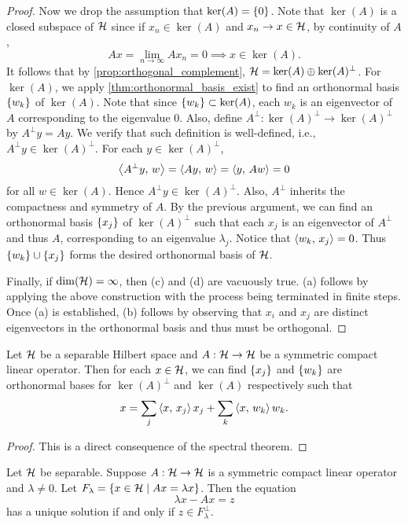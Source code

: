 \begin{proof}
    Now we drop the assumption that $\ker(A) = \left\{ {0} \right\}$. Note that $\ker(A)$ is a 
    closed subspace of $\mathcal{H}$ since if $x_n\in\ker(A)$ and $x_n\to x\in\mathcal{H}$, by continuity 
    of $A$, 
    \begin{equation*}
        Ax = \lim_{n\to\infty} Ax_n = 0
        \implies x\in\ker(A).
    \end{equation*} 
    It follows that by \cref{prop:orthogonal_complement}, $\mathcal{H} = \ker(A)\oplus\ker(A)^\perp$. 
    For $\ker(A)$, we apply \cref{thm:orthonormal_basis_exist} to find an orthonormal 
    basis $\left\{ {w_k} \right\}$ of $\ker(A)$. Note that since $\left\{ {w_k} \right\}\subset \ker(A)$, each 
    $w_k$ is an eigenvector of $A$ corresponding to the eigenvalue $0$. Also, 
    define $A^\perp:\ker(A)^\perp\to\ker(A)^\perp$ by $A^\perp y = Ay$. We verify 
    that such definition is well-defined, i.e., $A^\perp y\in\ker(A)^\perp$. For 
    each $y\in\ker(A)^\perp$,
    \begin{equation*}
        \left\langle {A^\perp y},\, {w} \right\rangle = \left\langle {Ay},\, {w} \right\rangle = \left\langle {y},\, {Aw} \right\rangle = 0
    \end{equation*}
    for all $w\in\ker(A)$. Hence $A^\perp y\in\ker(A)^\perp$. Also, $A^\perp$ inherits 
    the compactness and symmetry of $A$. By the previous argument, we can find an 
    orthonormal basis $\left\{ {x_j} \right\}$ of $\ker(A)^\perp$ such that each $x_j$ is an 
    eigenvector of $A^\perp$ and thus $A$, corresponding to an eigenvalue $\lambda_j$. 
    Notice that $\left\langle {w_k},\, {x_j} \right\rangle = 0$. Thus $\left\{ {w_k} \right\}\cup\left\{ {x_j} \right\}$ forms the desired 
    orthonormal basis of $\mathcal{H}$. 

    Finally, if $\dim(\mathcal{H}) = \infty$, then (c) and (d) are vacuously true. 
    (a) follows by applying the above construction with the process 
    being terminated in finite steps. Once (a) is established, (b) follows 
    by observing that $x_i$ and $x_j$ are distinct eigenvectors in the orthonormal 
    basis and thus must be orthogonal.
\end{proof}

\begin{corollary}
    Let $\mathcal{H}$ be a separable Hilbert space and $A:\mathcal{H}\to\mathcal{H}$ be a symmetric compact 
    linear operator. Then for each $x\in\mathcal{H}$, we can find $\left\{ {x_j} \right\}$ and $\left\{ {w_k} \right\}$ 
    are orthonormal bases for $\ker(A)^\perp$ and $\ker(A)$ respectively such that 
    \begin{equation*}
        x = \sum_j\left\langle {x},\, {x_j} \right\rangle x_j + \sum_k\left\langle {x},\, {w_k} \right\rangle w_k.
    \end{equation*}
\end{corollary}
\begin{proof}
    This is a direct consequence of the spectral theorem.
\end{proof}

\begin{theorem}
    Let $\mathcal{H}$ be separable. Suppose $A:\mathcal{H}\to\mathcal{H}$ is a symmetric compact 
    linear operator and $\lambda\neq 0$. Let $F_\lambda = \left\{ x\in\mathcal{H} \;\middle\vert\; Ax = \lambda x \right\}$. 
    Then the equation 
    \begin{equation*}
        \lambda x - Ax = z
    \end{equation*}
    has a unique solution if and only if $z\in F_\lambda^\perp$.
\end{theorem}